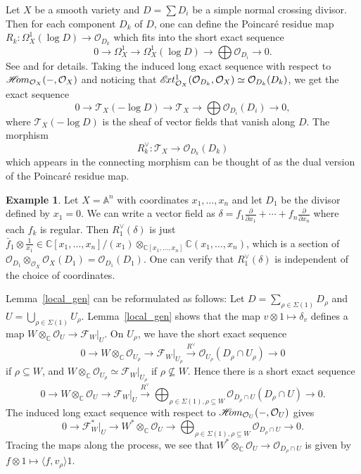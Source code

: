 \documentclass[12pt,reqno]{amsart}
\theoremstyle{definition}
\newtheorem{example}[theorem]{Example}
\newcommand{\mc}{\mathcal}
\newcommand{\mb}{\mathbb}
\newcommand*{\sheafhom}{\mathscr{H}\kern -2.5pt om}
\newcommand*{\sheafext}{\mathscr{E}\kern -1.5pt xt}
\newcommand\cT{{\mathcal{T}}}
\begin{document}
Let $X$ be a smooth variety and $D=\sum D_i$ be a simple normal crossing divisor. Then for each component $D_k$ of $D$, one can define the Poincar\'e residue map
$R_k\colon \Omega^1_X(\log D)\rightarrow \mc O_{D_k}$
which fits into the short exact sequence 
\[
0\rightarrow \Omega_X^1\rightarrow \Omega_X^1(\log D)\rightarrow \bigoplus \mc O_{D_i}\rightarrow 0. 
\]
See \cite[(8.1.6)]{CLS11} and \cite[p.254]{psmixedhodge} for details.
Taking the induced long exact sequence with respect to $\sheafhom_{\mc O_X}(-,\mc O_X)$ and noticing that $\sheafext^1_{\mc O_X}(\mc O_{D_k},\mc O_X)\simeq \mc O_{D_k}(D_k)$, we get the exact sequence
\[
0\rightarrow\cT_X(-\log D)\rightarrow\cT_X\rightarrow \bigoplus \mc O_{D_i}(D_i)\rightarrow 0,
\]
where $\cT_X(-\log D)$ is the sheaf of vector fields that vanish along $D$.
The morphism
\[
R_k^\vee\colon \cT_X \rightarrow \mc O_{D_k}(D_k)
\]
which appears in the connecting morphism can be thought of as the dual version of the  Poincar\'e residue map.

\begin{example}
Let $X=\mb A^n$ with coordinates $x_1,\ldots,x_n$ and let $D_1$ be the divisor defined by $x_1=0$.
We can write a vector field as $\delta=f_1\frac{\partial}{\partial x_1}+\cdots+f_n\frac{\partial}{\partial x_n}$ where each $f_k$ is regular. Then $R_1^\vee(\delta)$ is just $\bar f_1\otimes \frac{1}{x_1}\in \mb C[x_1,\ldots,x_n]/(x_1)\otimes_{\mb C[x_1,\ldots,x_n]}\mb C(x_1,\ldots,x_n)$, which is a section of $\mc O_{D_1}\otimes_{\mc O_X}\mc O_X(D_1)=\mc O_{D_1}(D_1)$. One can verify that  $R_1^\vee(\delta)$ is independent of the choice of coordinates.
\end{example}

Lemma~\ref{local_gen} can be reformulated as follows: Let $D=\sum_{\rho\in\Sigma(1)} D_\rho$ and $U=\bigcup_{\rho\in\Sigma(1)}U_\rho$.
Lemma~\ref{local_gen} shows that the map $v\otimes 1\mapsto \delta_v$ defines a map $W\otimes_{\mb C}\mc O_U\rightarrow \mc F_W\vert_{U}$. On $U_\rho$, we have the short exact sequence
\[
 0\rightarrow W\otimes_\mb C\mc O_{U_\rho}\rightarrow  \mc F_W\vert_{U_\rho}\overset{R^\vee}{\rightarrow} \mc O_{U_\rho}(D_\rho\cap U_\rho)\rightarrow 0
\]
if $\rho\subseteq W$, and $W\otimes_\mb C\mc O_{U_\rho}\simeq \mc F_W\vert_{U_\rho}$ if $\rho\nsubseteq W$. Hence there is a short exact sequence
\[
0 \rightarrow W\otimes_{\mb C}\mc O_U \rightarrow  \mc F_W\vert_{U}\overset{R^\vee}{\rightarrow} \bigoplus_{\rho\in\Sigma(1),\rho\subseteq W}\mc O_{D_\rho\cap U}(D_\rho\cap U)\rightarrow 0.   
\]
The induced long exact sequence with respect to $\sheafhom_{\mc O_U}(-,\mc O_U)$ gives
\begin{equation}\label{ses_on_U}
0\rightarrow \mc F_W^*\vert_U\rightarrow W^*\otimes_{\mb C}\mc O_U\rightarrow \bigoplus_{\rho\in\Sigma(1),\rho\subseteq W}\mc O_{D_\rho\cap U}\rightarrow 0.
\end{equation}
Tracing the maps along the process, we see that $W^*\otimes_{\mb C}\mc O_{U}\rightarrow \mc O_{D_\rho\cap U}$ is given by $f\otimes 1\mapsto \langle f,v_\rho\rangle 1$.
\end{document}
